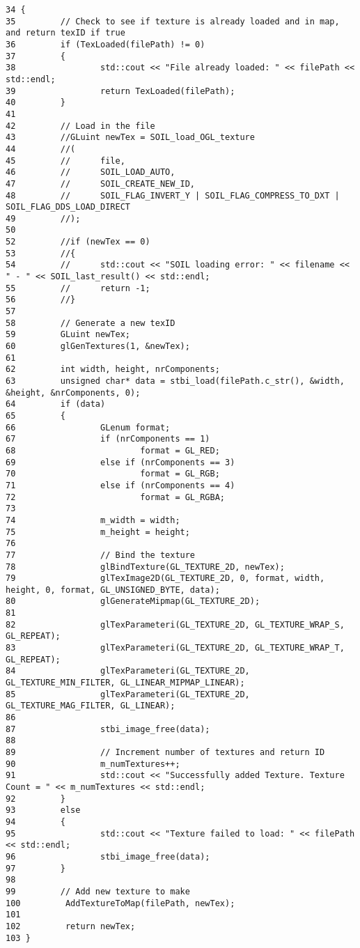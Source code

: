 \begin{Code}\begin{verbatim}34 {
35         // Check to see if texture is already loaded and in map, and return texID if true
36         if (TexLoaded(filePath) != 0)
37         {
38                 std::cout << "File already loaded: " << filePath << std::endl;
39                 return TexLoaded(filePath);
40         }
41 
42         // Load in the file
43         //GLuint newTex = SOIL_load_OGL_texture
44         //(
45         //      file,
46         //      SOIL_LOAD_AUTO,
47         //      SOIL_CREATE_NEW_ID,
48         //      SOIL_FLAG_INVERT_Y | SOIL_FLAG_COMPRESS_TO_DXT | SOIL_FLAG_DDS_LOAD_DIRECT
49         //);
50 
52         //if (newTex == 0)
53         //{
54         //      std::cout << "SOIL loading error: " << filename << " - " << SOIL_last_result() << std::endl;
55         //      return -1;
56         //}
57 
58         // Generate a new texID
59         GLuint newTex;
60         glGenTextures(1, &newTex);
61 
62         int width, height, nrComponents;
63         unsigned char* data = stbi_load(filePath.c_str(), &width, &height, &nrComponents, 0);
64         if (data)
65         {
66                 GLenum format;
67                 if (nrComponents == 1)
68                         format = GL_RED;
69                 else if (nrComponents == 3)
70                         format = GL_RGB;
71                 else if (nrComponents == 4)
72                         format = GL_RGBA;
73 
74                 m_width = width;
75                 m_height = height;
76 
77                 // Bind the texture
78                 glBindTexture(GL_TEXTURE_2D, newTex);
79                 glTexImage2D(GL_TEXTURE_2D, 0, format, width, height, 0, format, GL_UNSIGNED_BYTE, data);
80                 glGenerateMipmap(GL_TEXTURE_2D);
81 
82                 glTexParameteri(GL_TEXTURE_2D, GL_TEXTURE_WRAP_S, GL_REPEAT);
83                 glTexParameteri(GL_TEXTURE_2D, GL_TEXTURE_WRAP_T, GL_REPEAT);
84                 glTexParameteri(GL_TEXTURE_2D, GL_TEXTURE_MIN_FILTER, GL_LINEAR_MIPMAP_LINEAR);
85                 glTexParameteri(GL_TEXTURE_2D, GL_TEXTURE_MAG_FILTER, GL_LINEAR);
86 
87                 stbi_image_free(data);
88 
89                 // Increment number of textures and return ID
90                 m_numTextures++;
91                 std::cout << "Successfully added Texture. Texture Count = " << m_numTextures << std::endl;
92         }
93         else
94         {
95                 std::cout << "Texture failed to load: " << filePath << std::endl;
96                 stbi_image_free(data);
97         }
98 
99         // Add new texture to make
100         AddTextureToMap(filePath, newTex);
101 
102         return newTex;
103 }
\end{verbatim}
\end{Code}




